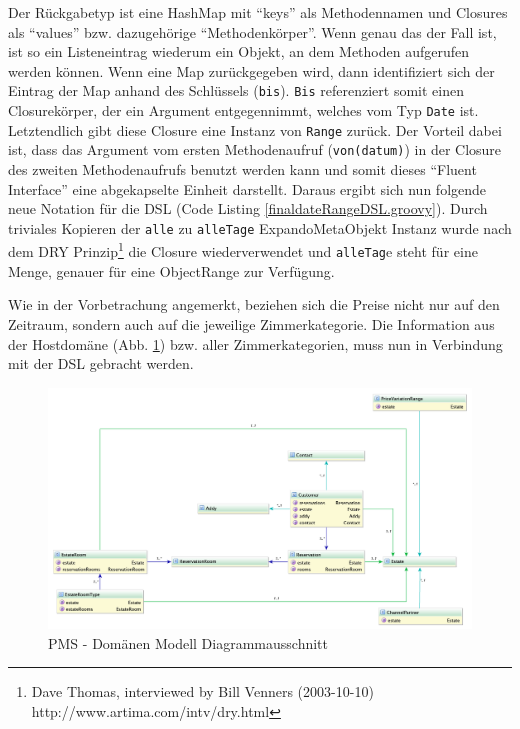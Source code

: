\documentclass[11pt,english,ngerman, headsepline]{scrreprt}
\begin{document}


Der Rückgabetyp ist eine HashMap mit ``keys'' als Methodennamen und Closures als
``values'' bzw. dazugehörige ``Methodenkörper''.
Wenn genau das der Fall ist, ist so ein Listeneintrag wiederum ein Objekt, an
dem Methoden aufgerufen werden können. Wenn eine Map zurückgegeben wird, dann
identifiziert sich der Eintrag der Map anhand des Schlüssels (\texttt{bis}).
\texttt{Bis} referenziert somit einen Closurekörper, der ein Argument entgegennimmt,
welches vom Typ \texttt{Date} ist. Letztendlich gibt diese Closure eine Instanz
von \texttt{Range} zurück. Der Vorteil dabei ist, dass das Argument vom ersten
Methodenaufruf (\texttt{von(datum)}) in der Closure des zweiten Methodenaufrufs
benutzt werden kann und somit dieses ``Fluent Interface'' eine abgekapselte
Einheit darstellt.
Daraus ergibt sich nun folgende neue Notation für die DSL (Code Listing
\ref{finaldateRangeDSL.groovy}).
Durch triviales Kopieren der \texttt{alle} zu \texttt{alleTage} ExpandoMetaObjekt
Instanz wurde nach dem DRY Prinzip\footnote{Dave Thomas, interviewed by Bill Venners
(2003-10-10) http://www.artima.com/intv/dry.html} die Closure
wiederverwendet und \texttt{alleTag}e steht für eine Menge, genauer für eine
ObjectRange zur Verfügung.


 
Wie in der Vorbetrachung angemerkt, beziehen sich die Preise nicht nur auf den
Zeitraum, sondern auch auf die jeweilige Zimmerkategorie.
Die Information aus der Hostdomäne (Abb. \ref{domainModelDia.png}) bzw. aller
Zimmerkategorien, muss nun in Verbindung mit der DSL gebracht werden.

 
\begin{figure}[h!]
	\begin{center}
	\includegraphics[width=1.3\textwidth,angle=90]{pics/domainModelDia.png}
	\end{center}
	\caption{PMS - Domänen Modell Diagrammausschnitt}
	\label{domainModelDia.png}
\end{figure}
\end{document}
